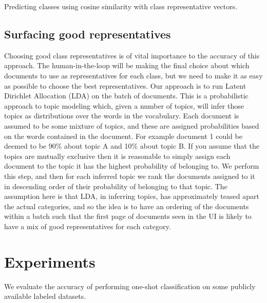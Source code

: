 \documentclass{article} %
\begin{document}
\begin{algorithm}[!h]
\caption{Predicting classes using cosine similarity with class representative vectors.}
\label{algo:classification}
\end{algorithm}

\subsection{Surfacing good representatives}
Choosing good class representatives is of vital importance to the accuracy of this approach. The human-in-the-loop will be making the final choice about which documents to use as representatives for each class, but we need to make it as easy as possible to choose the best representatives. Our approach is to run Latent Dirichlet Allocation (LDA) on the batch of documents. This is a probabilistic approach to topic modeling which, given a number of topics, will infer those topics as distributions over the words in the vocabulary. Each document is assumed to be some mixture of topics, and these are assigned probabilities based on the words contained in the document. For example document 1 could be deemed to be 90\% about topic A and 10\% about topic B. If you assume that the topics are mutually exclusive then it is reasonable to simply assign each document to the topic it has the highest probability of belonging to. We perform this step, and then for each inferred topic we rank the documents assigned to it in descending order of their probability of belonging to that topic. The assumption here is that LDA, in inferring topics, has approximately teased apart the actual categories, and so the idea is to have an ordering of the documents within a batch such that the first page of documents seen in the UI is likely to have a mix of good representatives for each category.

\section{Experiments}
We evaluate the accuracy of performing one-shot classification on some publicly available labeled datasets.
\end{document}
